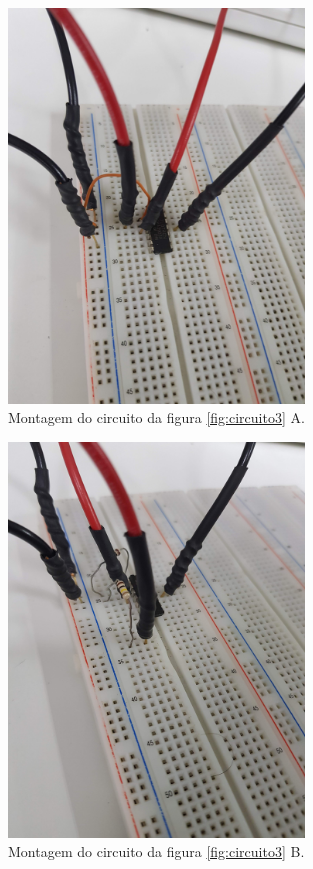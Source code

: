 \documentclass{abntex2}
\begin{document}
\begin{figure}[h]
  \centering
  \includegraphics[width = 0.7\textwidth]{circ_2.jpg}
  \caption{Montagem do circuito da figura \ref{fig:circuito3} A.}
  \label{fig:montagem3}
\end{figure}
\begin{figure}[h]
  \centering
  \includegraphics[width = 0.7\textwidth]{circ_3.jpg}
  \caption{Montagem do circuito da figura \ref{fig:circuito3} B.}
  \label{fig:montagem4}
\end{figure}
\end{document}

